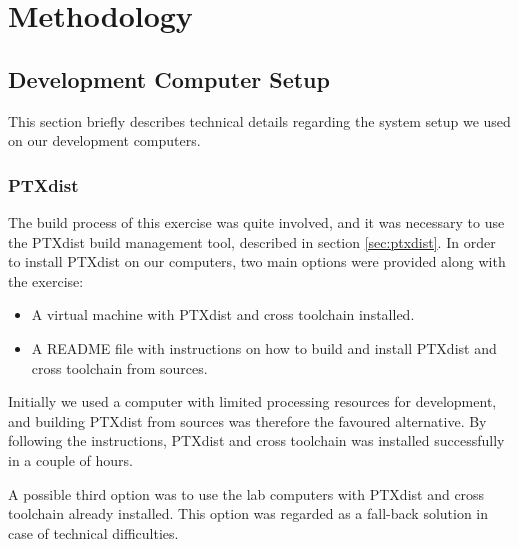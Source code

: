 \chapter{Methodology}

\section{Development Computer Setup}
This section briefly describes technical details regarding the system setup we used on our development computers.

\subsection{PTXdist}
The build process of this exercise was quite involved, and it was necessary to use the PTXdist build management tool, described in section \ref{sec:ptxdist}. In order to install PTXdist on our computers, two main options were provided along with the exercise:
\begin{itemize}
  \item A virtual machine with PTXdist and cross toolchain installed.
  \item A README file with instructions on how to build and install PTXdist and cross toolchain from sources.
\end{itemize}

Initially we used a computer with limited processing resources for development, and building PTXdist from sources was therefore the favoured alternative. By following the instructions, PTXdist and cross toolchain was installed successfully in a couple of hours.

A possible third option was to use the lab computers with PTXdist and cross toolchain already installed. This option was regarded as a fall-back solution in case of technical difficulties.

